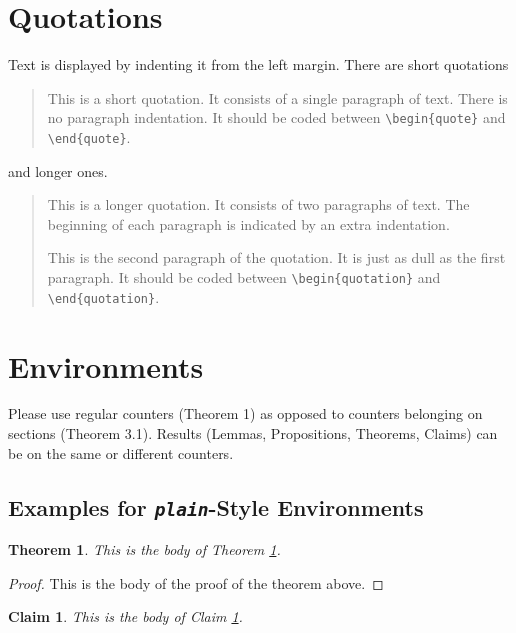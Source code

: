 \documentclass[ecta,nameyear,final,supplement]{econsocart}
\theoremstyle{plain}
\newtheorem{theorem}{Theorem}
\newtheorem{claim}{Claim}
\theoremstyle{definition}
\begin{document}
\section{Quotations}

Text is displayed by indenting it from the left margin. There are short quotations
\begin{quote}
This is a short quotation.  It consists of a
single paragraph of text.  There is no paragraph
indentation. It should be coded between \verb|\begin{quote}| and \verb|\end{quote}|.
\end{quote}
and longer ones.
\begin{quotation}
This is a longer quotation.  It consists of two paragraphs
of text.  The beginning of each paragraph is indicated
by an extra indentation.

This is the second paragraph of the quotation.  It is just
as dull as the first paragraph. It should be coded between \verb|\begin{quotation}| and \verb|\end{quotation}|.
\end{quotation}

\section{Environments}

Please use regular counters (Theorem 1) as opposed to counters belonging on sections (Theorem 3.1). Results (Lemmas, Propositions, Theorems, Claims) can be on the same or different counters.

\subsection{Examples for \emph{\texttt{plain}}-Style Environments}

\begin{theorem}\label{th1}
This is the body of Theorem \ref{th1}.
\end{theorem}


\begin{proof}
This is the body of the proof of the theorem above.
\end{proof}

\begin{claim}\label{cl1}
This is the body of Claim \ref{cl1}. 
\end{claim}
\end{document}

